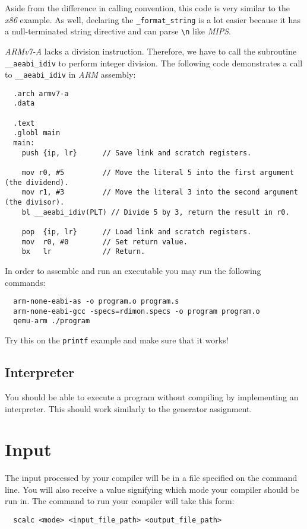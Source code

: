 \documentclass{article}
\newcommand{\code}[1]{\texttt{\textmd{#1}}}
\begin{document}
Aside from the difference in calling convention, this code is very similar to the \textit{x86}
example. As well, declaring the \code{\_format\_string} is a lot easier because it has a
null-terminated string directive and can parse \code{\textbackslash n} like \textit{MIPS}.

\textit{ARMv7-A} lacks a division instruction. Therefore, we have to call the subroutine
\code{\_\_aeabi\_idiv} to perform integer division. The following code demonstrates a call to
\code{\_\_aeabi\_idiv} in \textit{ARM} assembly:

\begin{lstlisting}
  .arch armv7-a
  .data

  .text
  .globl main
  main:
    push {ip, lr}      // Save link and scratch registers.

    mov r0, #5         // Move the literal 5 into the first argument (the dividend).
    mov r1, #3         // Move the literal 3 into the second argument (the divisor).
    bl __aeabi_idiv(PLT) // Divide 5 by 3, return the result in r0.

    pop  {ip, lr}      // Load link and scratch registers.
    mov  r0, #0        // Set return value.
    bx   lr            // Return.
\end{lstlisting}

In order to assemble and run an executable you may run the following commands:
\begin{lstlisting}
  arm-none-eabi-as -o program.o program.s
  arm-none-eabi-gcc -specs=rdimon.specs -o program program.o
  qemu-arm ./program
\end{lstlisting}

Try this on the \texttt{printf} example and make sure that it works!

\subsection{Interpreter}
You should be able to execute a program without compiling by implementing an interpreter. This
should work similarly to the generator assignment.

\section{Input}
The input processed by your compiler will be in a file specified on the command line. You will also
receive a value signifying which mode your compiler should be run in. The command to run your
compiler will take this form:
\begin{lstlisting}
  scalc <mode> <input_file_path> <output_file_path>
\end{lstlisting}
\end{document}
